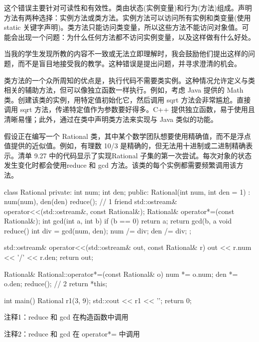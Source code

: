 这个错误主要针对可读性和有效性。类由状态(实例变量)和行为(方法)组成。声明方法有两种选择：实例方法或类方法。实例方法可以访问所有实例和类变量(使用 static 关键字声明)。类方法只能访问类变量，所以这些方法不能访问对象值。可能会出现一个问题：为什么任何方法都不访问实例变量，以及这样做有什么好处。

当我的学生发现所教的内容不一致或无法立即理解时，我会鼓励他们提出这样的问题，而不是盲目地接受我的教学。这种错误是提出问题，并寻求澄清的机会。

类方法的一个众所周知的优点是，执行代码不需要类实例。这种情况允许定义与类相关的辅助方法，但可以像独立函数一样执行。例如，考虑 Java 提供的 Math 类。创建该类的实例，用特定值初始化它，然后调用 sqrt 方法会非常尴尬。直接调用 sqrt 方法，传递特定值作为参数要好得多。C++ 提供独立函数，易于使用且清晰易懂；此外，通过在类中声明类方法来实现与 Java 类似的功能。


假设正在编写一个 Rational 类，其中某个数学团队想要使用精确值，而不是浮点值提供的近似值。例如，有理数 10/3 是精确的，但无法用十进制或二进制精确表示。清单 9.27 中的代码显示了实现Rational 子集的第一次尝试。每次对象的状态发生变化时都会使用reduce 和 gcd 方法。该类的每个实例都需要频繁调用该方法。


\begin{cpp}
class Rational {
private:
  int num;
  int den;
public:
  Rational(int num, int den = 1) : num(num), den(den)
    { reduce(); } // 1
  friend std::ostream& operator<<(std::ostream&, const Rational&);
  Rational& operator*=(const Rational&);
  int gcd(int a, int b) {
    if (b == 0)
      return a;
    return gcd(b, a %
  }
  void reduce() {
    int div = gcd(num, den);
    num /= div;
    den /= div;
  }
};

std::ostream& operator<<(std::ostream& out, const Rational& r) {
  out << r.num << '/' << r.den;
  return out;
}

Rational& Rational::operator*=(const Rational& o) {
  num *= o.num;
  den *= o.den;
  reduce(); // 2
  return *this;
}

int main() {
  Rational r1(3, 9);
  std::cout << r1 << '\n';
  return 0;
}
\end{cpp}

{\footnotesize
注释1：reduce 和 gcd 在构造函数中调用

注释2：reduce 和 gcd 在 operator*= 中调用
}


